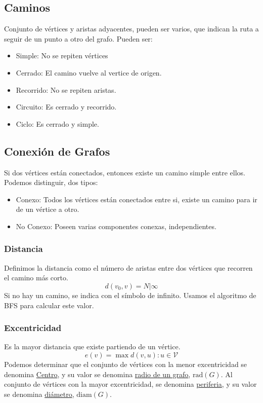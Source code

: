 \subsection{Caminos}
Conjunto de vértices y aristas adyacentes, pueden ser varios, que indican la ruta a seguir de un punto a otro del grafo. Pueden ser:
\begin{itemize}
        \item Simple: No se repiten vértices
        \item Cerrado: El camino vuelve al vertice de origen.
        \item Recorrido: No se repiten aristas.
        \item Circuito: Es cerrado y recorrido.
        \item Ciclo: Es cerrado y simple.
\end{itemize}
\subsection{Conexión de Grafos}
Si dos vértices están conectados, entonces existe un camino simple entre ellos. Podemos distinguir, dos tipos:
\begin{itemize}
        \item Conexo: Todos los vértices están  conectados entre si, existe un camino para ir de un vértice a otro.
        \item No Conexo: Poseen varias componentes conexas, independientes.
\end{itemize}
\subsubsection{Distancia}
Definimos la distancia como el número de aristas entre dos vértices que recorren el camino más corto.
\[
        d(v_0, v) = N | \infty
\]
Si no hay un camino, se indica con el símbolo de infinito. Usamos el algoritmo de BFS para calcular este valor.
\subsubsection{Excentricidad}
Es la mayor distancia que existe partiendo de un vértice.
\[
        e(v) = \max{d(v,u) : u\in \mathcal{V}}
\]
Podemos determinar que el conjunto de vértices con la menor excentricidad se denomina \underline{Centro}, y su valor se denomina \underline{radio de un grafo}, \(\text{rad}(G)\). Al conjunto de vértices con la mayor excentricidad, se denomina \underline{periferia}, y su valor se denomina \underline{diámetro}, \(\text{diam}(G)\).
